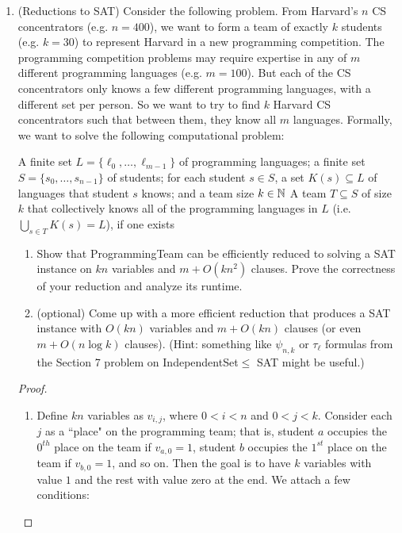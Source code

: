 \documentclass[11pt]{article}
\begin{document}
\begin{enumerate}
\begin{proof}[Solution]
\end{proof}
  
\item (Reductions to SAT)  Consider the following problem.  From Harvard's $n$ CS concentrators (e.g. $n=400$), we want to form a team of exactly $k$ students (e.g. $k=30$) to represent Harvard in a new programming competition.  The programming competition problems may require expertise in any of $m$ different programming languages (e.g. $m=100$).  But each of the CS concentrators only knows a few different programming languages, with a different set per person. So we want to try to find $k$ Harvard CS concentrators such that between them, they know all $m$ languages. Formally, we want to solve the following computational problem:

{A finite set $L=\{\ell_0,\ldots,\ell_{m-1}\}$ of programming languages; a finite set 
$S=\{s_0,\ldots,s_{n-1}\}$ of students; for each student $s\in S$, a set $K(s)\subseteq L$ of languages that student $s$ knows; and a team size $k\in \mathbb{N}$}
{A team $T\subseteq S$ of size $k$ that collectively knows all of the programming languages in $L$ (i.e. $\bigcup_{s\in T} K(s)=L$), if one exists}

\begin{enumerate}
    \item 
Show that ProgrammingTeam can be efficiently reduced to solving a SAT instance on $kn$ variables and $m+O(kn^2)$ clauses.  Prove the correctness of your reduction and analyze its runtime.

\item 
(optional\footnotemark[1])
Come up with a more efficient reduction that produces a SAT instance with $O(kn)$ variables and $m+O(kn)$ clauses (or even $m+O(n\log k)$ clauses). (Hint: something like $\psi_{n,k}$ or $\tau_\ell$ formulas from the Section 7 problem on IndependentSet$\leq$ SAT might be useful.)
\end{enumerate}

\begin{proof}
\begin{enumerate}

\item Define $kn$ variables as $v_{i, j}$, where $0 < i < n$ and $0 < j < k$. Consider each $j$ as a ``place" on the programming team; that is, student $a$ occupies the $0^{th}$ place on the team if $v_{a, 0} = 1$, student $b$ occupies the $1^{st}$ place on the team if $v_{b, 0} = 1$, and so on. Then the goal is to have $k$ variables with value $1$ and the rest with value zero at the end. We attach a few conditions:


\end{enumerate}
\end{proof}
\end{enumerate}
\end{document}
